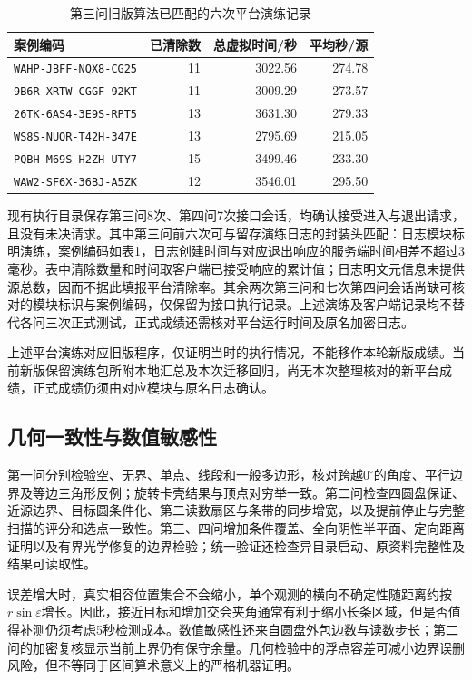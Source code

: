 \documentclass{JXUSTmodeling}
\begin{document}
\begin{table}[htbp]
\centering\small
\caption{第三问旧版算法已匹配的六次平台演练记录}
\label{tab:p3-practice}
\begin{tabular}{lrrr}
\toprule
案例编码 & 已清除数 & 总虚拟时间/秒 & 平均秒/源\\
\midrule
\texttt{WAHP-JBFF-NQX8-CG25}&11&3022.56&274.78\\
\texttt{9B6R-XRTW-CGGF-92KT}&11&3009.29&273.57\\
\texttt{26TK-6AS4-3E9S-RPT5}&13&3631.30&279.33\\
\texttt{WS8S-NUQR-T42H-347E}&13&2795.69&215.05\\
\texttt{PQBH-M69S-H2ZH-UTY7}&15&3499.46&233.30\\
\texttt{WAW2-SF6X-36BJ-A5ZK}&12&3546.01&295.50\\
\bottomrule
\end{tabular}
\end{table}

现有执行目录保存第三问8次、第四问7次接口会话，均确认接受进入与退出请求，且没有未决请求。其中第三问前六次可与留存演练日志的封装头匹配：日志模块标明演练，案例编码如表\ref{tab:p3-practice}，日志创建时间与对应退出响应的服务端时间相差不超过3毫秒。表中清除数量和时间取客户端已接受响应的累计值；日志明文元信息未提供源总数，因而不据此填报平台清除率。其余两次第三问和七次第四问会话尚缺可核对的模块标识与案例编码，仅保留为接口执行记录。上述演练及客户端记录均不替代各问三次正式测试，正式成绩还需核对平台运行时间及原名加密日志。

上述平台演练对应旧版程序，仅证明当时的执行情况，不能移作本轮新版成绩。当前新版保留演练包所附本地汇总及本次迁移回归，尚无本次整理核对的新平台成绩，正式成绩仍须由对应模块与原名日志确认。

\subsection{几何一致性与数值敏感性}
第一问分别检验空、无界、单点、线段和一般多边形，核对跨越$0^\circ$的角度、平行边界及等边三角形反例；旋转卡壳结果与顶点对穷举一致。第二问检查四圆盘保证、近源边界、目标圆条件化、第二读数扇区与条带的同步增宽，以及提前停止与完整扫描的评分和选点一致性。第三、四问增加条件覆盖、全向阴性半平面、定向距离证明以及有界光学修复的边界检验；统一验证还检查异目录启动、原资料完整性及结果可读取性。

误差增大时，真实相容位置集合不会缩小，单个观测的横向不确定性随距离约按$r\sin\varepsilon$增长。因此，接近目标和增加交会夹角通常有利于缩小长条区域，但是否值得补测仍须考虑5秒检测成本。数值敏感性还来自圆盘外包边数与读数步长；第二问的加密复核显示当前上界仍有保守余量。几何检验中的浮点容差可减小边界误删风险，但不等同于区间算术意义上的严格机器证明。
\end{document}
